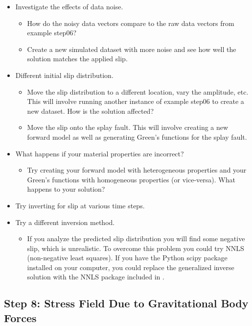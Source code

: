 \begin{itemize}
\item Investigate the effects of data noise.
  \begin{itemize}
  \item How do the noisy data vectors compare to the raw data vectors
    from example step06?
  \item Create a new simulated dataset with more noise and see how
    well the solution matches the applied slip.
  \end{itemize}
\item Different initial slip distribution.
  \begin{itemize}
  \item Move the slip distribution to a different location, vary the
    amplitude, etc. This will involve running another instance of example
    step06 to create a new dataset. How is the solution affected?
  \item Move the slip onto the splay fault. This will involve creating
    a new forward model as well as generating Green's functions for the
    splay fault.
  \end{itemize}
\item What happens if your material properties are incorrect?
  \begin{itemize}
  \item Try creating your forward model with heterogeneous properties
    and your Green's functions with homogeneous properties (or
    vice-versa). What happens to your solution?
  \end{itemize}
\item Try inverting for slip at various time steps.
\item Try a different inversion method.
  \begin{itemize}
  \item If you analyze the predicted slip distribution you will find
    some negative slip, which is unrealistic. To overcome this problem
    you could try NNLS (non-negative least squares). If you have the
    Python scipy package installed on your computer, you could replace
    the generalized inverse solution with the NNLS package included in
    .
  \end{itemize}
\end{itemize}

\subsection{Step 8: Stress Field Due to Gravitational Body Forces}

